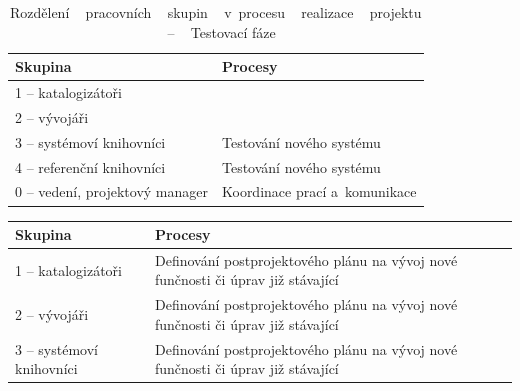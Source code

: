 \documentclass[
	11pt, oneside, printed, final, palatino
	microtype,
	table,   %
	lof,     %
	lot     %
]{fithesis3}
\newcommand{\bold}[1]{\textbf{#1}}
\begin{document}
{\begin{table}
    \centering
    \begin{tabular}{| p{3cm} | p{8.3cm} |}
    \hline
    \bold{Skupina} 	
    & 
    \bold{Procesy} 
    \\ \hline
    
	1 – katalogizátoři
    & 

    \\ \hline
    
	2 – vývojáři
    & 

    \\ \hline
    
	3 – systémoví knihovníci
    & 
    Testování nového systému
    \\ \hline
    
	4 – referenční knihovníci
    & 
    Testování nového systému
    \\ \hline
    
	0 – vedení, projektový manager
    & 
    Koordinace prací a~komunikace
    \\ \hline
    
    \end{tabular}
    \caption{Rozdělení ~ pracovních ~  skupin ~  v~procesu ~  realizace ~  projektu ~ – ~ Testovací fáze}
\end{table}

\begin{table}
    \centering
    \begin{tabular}{| p{3cm} | p{8.3cm} |}
    \hline
    \bold{Skupina} 	
    & 
    \bold{Procesy} 
    \\ \hline
    
	1 – katalogizátoři
    & 
	Definování postprojektového plánu na vývoj nové funčnosti či úprav již stávající
    \\ \hline
    
	2 – vývojáři
    & 
	Definování postprojektového plánu na vývoj nové funčnosti či úprav již stávající
    \\ \hline
    
	3 – systémoví knihovníci
    & 
    Definování postprojektového plánu na vývoj nové funčnosti či úprav již stávající
    \\ \hline
    

\end{tabular}
\end{table}}
\end{document}
